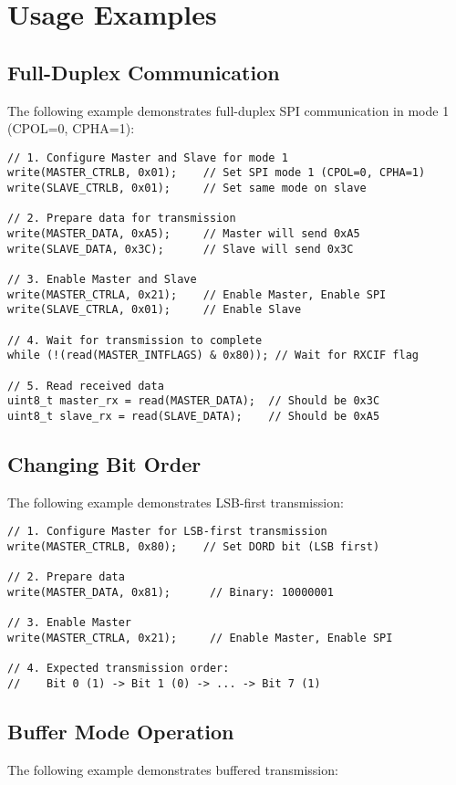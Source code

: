 \section{Usage Examples}

\subsection{Full-Duplex Communication}
The following example demonstrates full-duplex SPI communication in mode 1 (CPOL=0, CPHA=1):

\begin{verbatim}
// 1. Configure Master and Slave for mode 1
write(MASTER_CTRLB, 0x01);    // Set SPI mode 1 (CPOL=0, CPHA=1)
write(SLAVE_CTRLB, 0x01);     // Set same mode on slave

// 2. Prepare data for transmission
write(MASTER_DATA, 0xA5);     // Master will send 0xA5
write(SLAVE_DATA, 0x3C);      // Slave will send 0x3C

// 3. Enable Master and Slave
write(MASTER_CTRLA, 0x21);    // Enable Master, Enable SPI
write(SLAVE_CTRLA, 0x01);     // Enable Slave

// 4. Wait for transmission to complete
while (!(read(MASTER_INTFLAGS) & 0x80)); // Wait for RXCIF flag

// 5. Read received data
uint8_t master_rx = read(MASTER_DATA);  // Should be 0x3C
uint8_t slave_rx = read(SLAVE_DATA);    // Should be 0xA5
\end{verbatim}

\subsection{Changing Bit Order}
The following example demonstrates LSB-first transmission:

\begin{verbatim}
// 1. Configure Master for LSB-first transmission
write(MASTER_CTRLB, 0x80);    // Set DORD bit (LSB first)

// 2. Prepare data
write(MASTER_DATA, 0x81);      // Binary: 10000001

// 3. Enable Master
write(MASTER_CTRLA, 0x21);     // Enable Master, Enable SPI

// 4. Expected transmission order:
//    Bit 0 (1) -> Bit 1 (0) -> ... -> Bit 7 (1)
\end{verbatim}

\subsection{Buffer Mode Operation}
The following example demonstrates buffered transmission:

